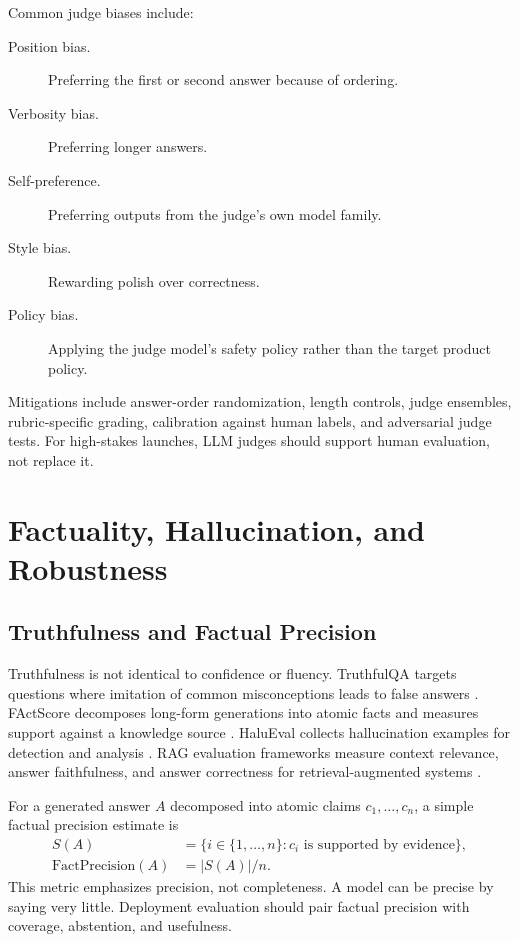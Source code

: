 Common judge biases include:
\begin{description}
    \item[Position bias.] Preferring the first or second answer because of ordering.
    \item[Verbosity bias.] Preferring longer answers.
    \item[Self-preference.] Preferring outputs from the judge's own model family.
    \item[Style bias.] Rewarding polish over correctness.
    \item[Policy bias.] Applying the judge model's safety policy rather than the target product policy.
\end{description}
Mitigations include answer-order randomization, length controls, judge ensembles, rubric-specific grading, calibration against human labels, and adversarial judge tests. For high-stakes launches, LLM judges should support human evaluation, not replace it.

\section{Factuality, Hallucination, and Robustness}
\subsection{Truthfulness and Factual Precision}
Truthfulness is not identical to confidence or fluency. TruthfulQA targets questions where imitation of common misconceptions leads to false answers \cite{lin2021truthfulqa}. FActScore decomposes long-form generations into atomic facts and measures support against a knowledge source \cite{min2023factscore}. HaluEval collects hallucination examples for detection and analysis \cite{li2023halueval}. RAG evaluation frameworks measure context relevance, answer faithfulness, and answer correctness for retrieval-augmented systems \cite{es2023ragas,gan2025rag}.

For a generated answer $A$ decomposed into atomic claims $c_1,\ldots,c_n$, a simple factual precision estimate is
\[
    \begin{aligned}
    S(A) &= \{i\in\{1,\ldots,n\}: c_i \text{ is supported by evidence}\},\\
    \mathrm{FactPrecision}(A)
      &= |S(A)|/n.
    \end{aligned}
\]
This metric emphasizes precision, not completeness. A model can be precise by saying very little. Deployment evaluation should pair factual precision with coverage, abstention, and usefulness.

